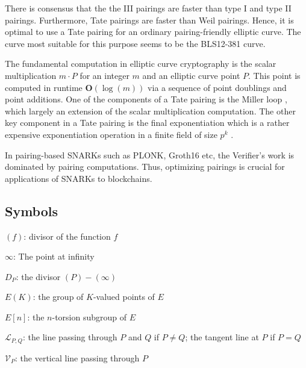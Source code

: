 \documentclass[11pt, lettersize, notitlepage, leqno, footskip=0.6cm]{article}
\newcommand{\mc}{\mathcal}
\newcommand{\mbf}{\mathbf}
\newcommand{\bO}{\mbf{O}}
\newcommand{\noin}{\noindent}
\numberwithin{equation}{section}
\begin{document}
There is consensus that the the III pairings are faster than type I and type II pairings. Furthermore, Tate pairings are faster than Weil pairings. Hence, it is optimal to use a Tate pairing for an ordinary pairing-friendly elliptic curve. The curve most suitable for this purpose seems to be the BLS12-381 curve.

The fundamental computation in elliptic curve cryptography is the scalar multiplication $m\cdot P$ for an integer $m$ and an elliptic curve point $P$. This point is computed in runtime $\bO(\log(m))$ via a sequence of point doublings and point additions. One of the components of a Tate pairing is the Miller loop , which largely an extension of the scalar multiplication computation. The other key component in a Tate pairing is the final exponentiation which is a rather expensive exponentiation operation in a finite field of size $p^k$ .  

In pairing-based SNARKs such as PLONK, Groth16 etc, the Verifier's work is dominated by pairing computations. Thus, optimizing pairings is crucial for applications of SNARKs to blockchains.











\subsection{\fontsize{11}{11}\selectfont Symbols}

\noin $(f)$: divisor of the function $f$ \vspace{0.1cm}

\noin $\infty$: The point at infinity \vspace{0.1cm}

\noin $D_P$: the divisor $(P)-(\infty)$ \vspace{0.1cm}

\noin $E(K)$: the group of $K$-valued points of $E$ \vspace{0.1cm}

\noin $E[n]$: the $n$-torsion subgroup of $E$ \vspace{0.1cm}

\noin $\mc{L}_{P,Q}$: the line passing through $P$ and $Q$ if $P\neq Q$; the tangent line at $P$ if $P = Q$ \vspace{0.1cm}

\noin $\mc{V}_{P}$: the vertical line passing through $P$ \vspace{0.1cm}
\end{document}

